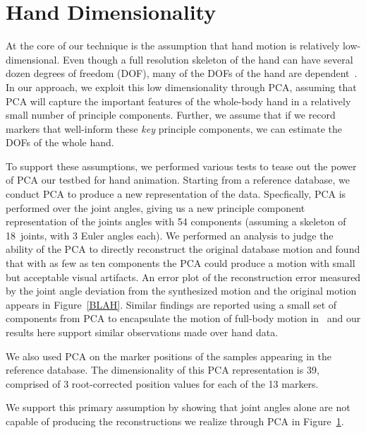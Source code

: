\section{Hand Dimensionality}

At the core of our technique is the assumption that hand motion is
relatively low-dimensional.  Even though a full resolution skeleton
of the hand can have several dozen degrees of freedom (DOF),
many of the DOFs of the hand are dependent~\cite{SanFlaSoe98,BraZha04,JoeOSu09}. 
In our approach, we exploit this low dimensionality through PCA, assuming that PCA
will capture the important features of the whole-body hand
in a relatively small number of principle components. 
Further, we assume that
if we record markers that well-inform these \emph{key} principle components, we can estimate the
DOFs of the whole hand.  

To support these assumptions, we performed various tests to tease out the power of
PCA our testbed for hand animation.
Starting from a reference database, we conduct PCA to produce a new representation
of the data.  
%
%
Specfically, PCA is performed 
over the joint angles, giving us a new principle component 
representation of the joints angles with 54 components (assuming a skeleton of 18~joints,
with 3 Euler angles each). 
%
We performed an analysis to judge the ability of the PCA to directly 
reconstruct the original database motion and found that with as few as ten 
components the PCA could produce a motion with small but acceptable 
visual artifacts.  An error plot of the reconstruction error measured by the
joint angle deviation from the synthesized motion and the original motion
appears in Figure~\ref{BLAH}.  Similar findings are reported using a small
set of components from PCA to
encapsulate the motion of full-body motion in~\cite{Alla} and our results
here support similar observations made over hand data.

We also used PCA on the marker positions of the samples appearing in 
the reference database.  The dimensionality of this PCA representation
is 39, comprised of 3 root-corrected position values for each of the 13 markers.  

We support this primary assumption by showing that joint angles alone
are not capable of producing the reconstructions we realize through PCA in Figure~\ref{}. 

